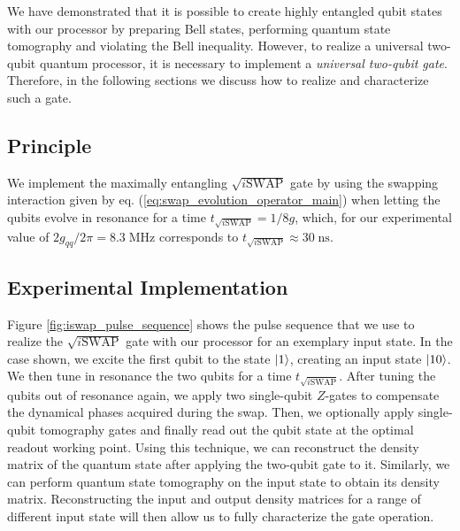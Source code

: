 We have demonstrated that it is possible to create highly entangled qubit states with our processor by preparing Bell states, performing quantum state tomography and violating the Bell inequality. However, to realize a universal two-qubit quantum processor, it is necessary to implement a {\it universal two-qubit gate}. Therefore, in the following sections we discuss how to realize and characterize such a gate.

\subsection{Principle}

We implement the maximally entangling $\sqrt{i\mathrm{SWAP}}$ gate by using the swapping interaction given by eq. (\ref{eq:swap_evolution_operator_main}) when letting the qubits evolve in resonance for a time $t_{\sqrt{i\mathrm{SWAP}}}=1/8g$, which, for our experimental value of $2g_{qq}/2\pi = 8.3\;\mathrm{MHz}$ corresponds to $t_{\sqrt{i\mathrm{SWAP}}}\approx 30\;\mathrm{ns}$. 

\subsection{Experimental Implementation}

Figure \ref{fig:iswap_pulse_sequence} shows the pulse sequence that we use to realize the $\sqrt{i\mathrm{SWAP}}$ gate with our processor for an exemplary input state. In the case shown, we excite the first qubit to the state $\left| 1 \right>$, creating an input state $\left| 10 \right>$. We then tune in resonance the two qubits for a time $t_{\sqrt{i\mathrm{SWAP}}}$. After tuning the qubits out of resonance again, we apply two single-qubit $Z$-gates to compensate the dynamical phases acquired during the swap. Then, we optionally apply single-qubit tomography gates and finally read out the qubit state at the optimal readout working point. Using this technique, we can reconstruct the density matrix of the quantum state after applying the two-qubit gate to it. Similarly, we can perform quantum state tomography on the input state to obtain its density matrix. Reconstructing the input and output density matrices for a range of different input state will then allow us to fully characterize the gate operation.

